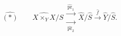 \(
\widehat{(\ast)}\qquad
\widehat{X\times_YX}/\widehat S
\mathrel{\substack{\xrightarrow{\ \widehat{\operatorname{pr}}_1\ }\\[-.7ex]
                   \xrightarrow[\ \widehat{\operatorname{pr}}_2\ ]{}}}
\widehat X/\widehat S
\xrightarrow{\ \widehat f\ }
\widehat Y/\widehat S.
\)
